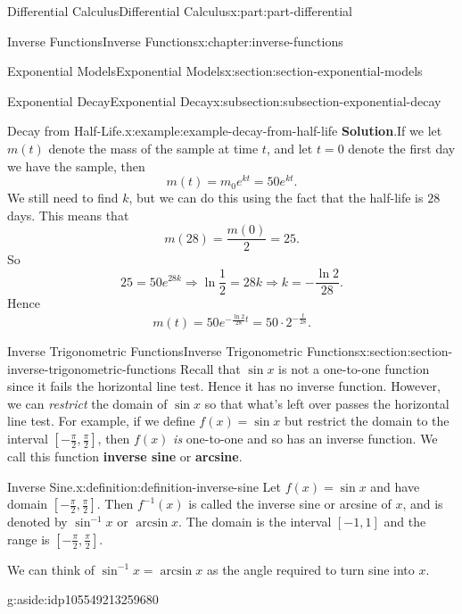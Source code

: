 \documentclass[twoside,10pt,]{book}
\newcommand{\blocktitlefont}{\relax}
\newcommand{\terminology}[1]{\textbf{#1}}
\numberwithin{equation}{part}
\begin{document}
\begin{partptx}{Differential Calculus}{}{Differential Calculus}{}{}{x:part:part-differential}
\begin{chapterptx}{Inverse Functions}{}{Inverse Functions}{}{}{x:chapter:inverse-functions}
\begin{sectionptx}{Exponential Models}{}{Exponential Models}{}{}{x:section:section-exponential-models}
\begin{subsectionptx}{Exponential Decay}{}{Exponential Decay}{}{}{x:subsection:subsection-exponential-decay}
\begin{example}{Decay from Half-Life.}{x:example:example-decay-from-half-life}
\noindent\textbf{\blocktitlefont Solution}.\hypertarget{g:solution:idp105549213311136}{}\quad{}If we let \(m(t)\) denote the mass of the sample at time \(t\), and let \(t=0\) denote the first day we have the sample, then%
\begin{equation*}
m(t) = m_{0}e^{kt} = 50e^{kt}.
\end{equation*}
We still need to find \(k\), but we can do this using the fact that the half-life is \(28\) days. This means that%
\begin{equation*}
m(28) = \frac{m(0)}{2} = 25.
\end{equation*}
So%
\begin{equation*}
25 = 50e^{28k}\Rightarrow \ln\frac{1}{2} = 28k\Rightarrow k = -\frac{\ln2}{28}.
\end{equation*}
Hence%
\begin{equation*}
m(t) = 50e^{-\frac{\ln2}{28}t} = 50\cdot2^{-\frac{t}{28}}.
\end{equation*}
%
\end{example}
\end{subsectionptx}
\end{sectionptx}
%
%
\typeout{************************************************}
\typeout{************************************************}
%
\begin{sectionptx}{Inverse Trigonometric Functions}{}{Inverse Trigonometric Functions}{}{}{x:section:section-inverse-trigonometric-functions}
Recall that \(\sin x\) is not a one-to-one function since it fails the horizontal line test. Hence it has no inverse function. However, we can \emph{restrict} the domain of \(\sin x\) so that what's left over passes the horizontal line test. For example, if we define \(f(x) = \sin x\) but restrict the domain to the interval \([-\frac{\pi}{2},\frac{\pi}{2}]\), then \(f(x)\) \emph{is} one-to-one and so has an inverse function. We call this function \terminology{inverse sine} or \terminology{arcsine}.%
\begin{definition}{Inverse Sine.}{x:definition:definition-inverse-sine}%
%
Let \(f(x) = \sin x\) and have domain \([-\frac{\pi}{2},\frac{\pi}{2}]\). Then \(f^{-1}(x)\) is called the inverse sine or arcsine of \(x\), and is denoted by \(\sin^{-1}x\) or \(\arcsin x\). The domain is the interval \([-1,1]\) and the range is \([-\frac{\pi}{2},\frac{\pi}{2}]\).%
\end{definition}
We can think of \(\sin^{-1}x = \arcsin x\) as the angle required to turn sine into \(x\). \begin{aside}{}{g:aside:idp105549213259680}%

\end{aside}
\end{sectionptx}
\end{chapterptx}
\end{partptx}
\end{document}
